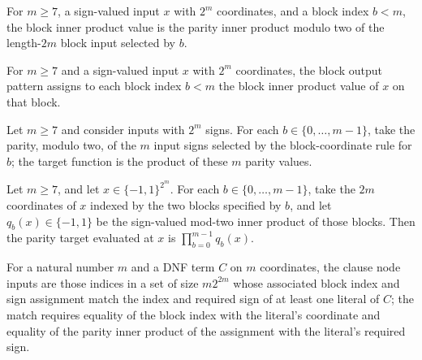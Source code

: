 \begin{definition}
\label{FABL.blockInnerProductValue}
\leanok
{}
For $m\ge 7$, a sign-valued input $x$ with $2^m$ coordinates, and a block index $b<m$,
the block inner product value is the parity inner product modulo two of the length-$2m$
block input selected by $b$.
\end{definition}

\begin{definition}
\label{FABL.blockOutputPattern}
\leanok
{}
For $m\ge 7$ and a sign-valued input $x$ with $2^m$ coordinates, the block output
pattern assigns to each block index $b<m$ the block inner product value of $x$ on that
block.
\end{definition}

\begin{definition}
\label{FABL.ac0ThresholdParityTarget}
\leanok
{}
Let $m\ge 7$ and consider inputs with $2^m$ signs. For each $b\in\{0,\ldots,m-1\}$, take
the parity, modulo two, of the $m$ input signs selected by the block-coordinate rule for
$b$; the target function is the product of these $m$ parity values.
\end{definition}

\begin{theorem}
\label{FABL.ac0ThresholdParityTarget_apply}
\leanok
{}
Let $m\ge 7$, and let $x\in\{-1,1\}^{2^m}$. For each $b\in\{0,\ldots,m-1\}$, take the
$2m$ coordinates of $x$ indexed by the two blocks specified by $b$, and let
$q_b(x)\in\{-1,1\}$ be the sign-valued mod-two inner product of those blocks. Then the
parity target evaluated at $x$ is $\prod_{b=0}^{m-1}q_b(x)$.
\end{theorem}

\begin{definition}
\label{FABL.clauseNodeInputs}
\leanok
{}
For a natural number $m$ and a DNF term $C$ on $m$ coordinates, the clause node inputs
are those indices in a set of size $m2^{2m}$ whose associated block index and sign
assignment match the index and required sign of at least one literal of $C$; the match
requires equality of the block index with the literal’s coordinate and equality of the
parity inner product of the assignment with the literal’s required sign.
\end{definition}

